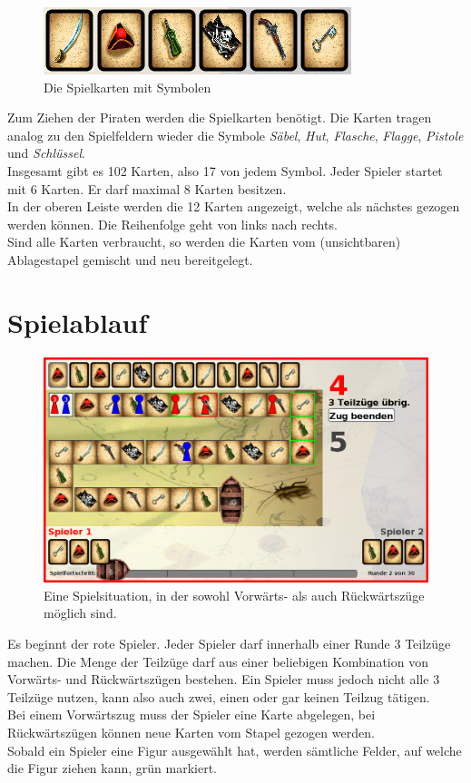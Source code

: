 \documentclass[a4paper, ngerman]{scrartcl}
\begin{document}
	\begin{figure}[h]
		\centering
		\includegraphics[scale = 0.5]{bilder/Karten}
		\caption{Die Spielkarten mit Symbolen}
		\label{fig:spielkarten}
	\end{figure}
	Zum Ziehen der Piraten werden die Spielkarten benötigt. Die Karten tragen
	analog zu den Spielfeldern wieder die Symbole \emph{Säbel},  \emph{Hut},
	\emph{Flasche}, \emph{Flagge}, \emph{Pistole} und
	\emph{Schlüssel}.\\
	Insgesamt gibt es 102 Karten, also 17 von jedem Symbol. Jeder Spieler startet
	mit 6 Karten. Er darf maximal 8 Karten besitzen.\\
	In der oberen Leiste werden die 12 Karten angezeigt, welche als
	nächstes gezogen werden können. Die Reihenfolge geht von links nach rechts.\\
	Sind alle Karten verbraucht, so werden die Karten vom (unsichtbaren)
	Ablagestapel gemischt und neu bereitgelegt.
\section{Spielablauf}
	
	\begin{figure}[h]
		\centering
		\includegraphics[scale=0.3]{bilder/Moves}
		\caption{Eine Spielsituation, in der sowohl Vorwärts- als auch Rückwärtszüge
		möglich sind.}
		\label{fig:PossibleMoves}
	\end{figure}
	
	Es beginnt der rote Spieler. Jeder Spieler darf innerhalb einer Runde 3
	Teilzüge machen. Die Menge der Teilzüge darf aus einer beliebigen Kombination
	von Vorwärts- und Rückwärtszügen bestehen. Ein Spieler muss jedoch nicht alle 3
	Teilzüge nutzen, kann also auch zwei, einen oder gar keinen Teilzug tätigen.\\
	Bei einem Vorwärtszug muss der Spieler eine Karte  abgelegen, bei
	Rückwärtszügen können neue Karten vom Stapel gezogen werden.\\
	Sobald ein Spieler eine Figur ausgewählt hat, werden sämtliche Felder, auf
	welche die Figur ziehen kann, grün markiert.
	
\end{document}
